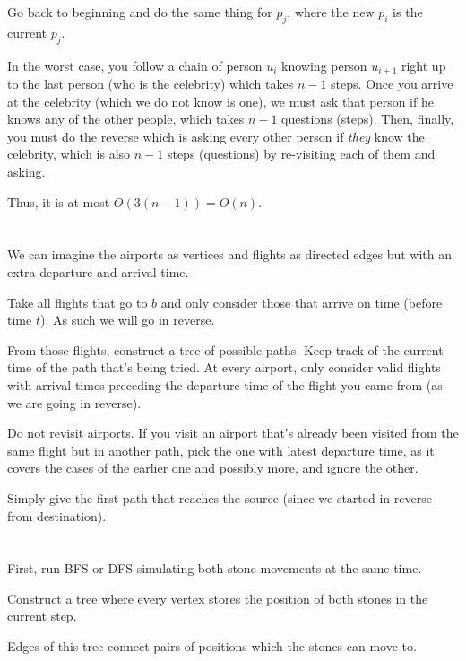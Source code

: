 \documentclass[11pt,letterpaper]{article}
\begin{document}
	Go back to beginning and do the same thing for $p_j$, where the new $p_i$ is the current $p_j$.\newline
	
	In the worst case, you follow a chain of person $u_i$ knowing person $u_{i+1}$ right up to the last person (who is the celebrity) which takes $n-1$ steps. Once you arrive at the celebrity (which we do not know is one), we must ask that person if he knows any of the other people, which takes $n-1$ questions (steps). Then, finally, you must do the reverse which is asking every other person if \textit{they} know the celebrity, which is also $n-1$ steps (questions) by re-visiting each of them and asking.
	
	Thus, it is at most $O(3(n-1))=O(n)$.
	
	\section{}
	We can imagine the airports as vertices and flights as directed edges but with an extra departure and arrival time.
	
	Take all flights that go to $b$ and only consider those that arrive on time (before time $t$). As such we will go in reverse.
	
	From those flights, construct a tree of possible paths. Keep track of the current time of the path that's being tried.
	At every airport, only consider valid flights with arrival times preceding the departure time of the flight you came from (as we are going in reverse).
	
	Do not revisit airports. If you visit an airport that's already been visited from the same flight but in another path, pick the one with latest departure time, as it covers the cases of the earlier one and possibly more, and ignore the other.
	
	Simply give the first path that reaches the source (since we started in reverse from destination).
	
	\section{}
	First, run BFS or DFS simulating both stone movements at the same time.
	
	Construct a tree where every vertex stores the position of both stones in the current step.
	
	Edges of this tree connect pairs of positions which the stones can move to.
	
\end{document}
